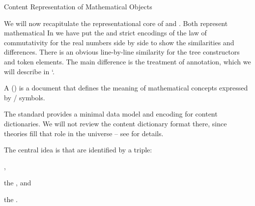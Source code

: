 \begin{omgroup}[id=mobj,short=Mathematical Objects]
\begin{omgroup}[id=mobj.core]{Content Representation of Mathematical Objects}
\begin{module}[id=mobj-core]
\begin{omtext}
We will now recapitulate the representational core of \openmath and \cmathml. Both
represent mathematical 
 In {} we have put the \openmath and strict \cmathml encodings
of the law of commutativity for the real numbers side by side to show the similarities and
differences. There is an obvious line-by-line similarity for the tree constructors and
token elements.  The main difference is the treatment of annotation, which we will
describe in `. 
\end{omtext}

\begin{definition}[id=cd.def]
  A  () is a  document
  that defines the meaning of mathematical concepts expressed by \openmath/\mathml
  symbols.
\end{definition}

The  standard provides a minimal data model and \xml encoding for content
dictionaries. We will not review the \openmath content dictionary format there, since
\omdoc theories fill that role in the \omdoc universe -- see  for
details. 

\begin{omtext}
The central idea is that  are identified by a triple: 
\begin{compactenum}
\item {},
\item the ,
  and 
\item the .
\end{compactenum}
\end{omtext}
\end{module}


\end{omgroup}
\end{omgroup}
